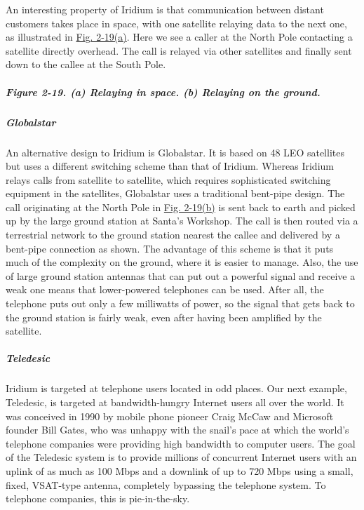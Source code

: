 An interesting property of Iridium is that communication between distant
customers takes place in space, with one satellite relaying data to the
next one, as illustrated in
\protect\hyperlink{0130661023_ch02lev1sec4.htmlux5cux23ch02fig19}{Fig.
2-19(a)}. Here we see a caller at the North Pole contacting a satellite
directly overhead. The call is relayed via other satellites and finally
sent down to the callee at the South Pole.

\subparagraph[Figure 2-19. (a) Relaying in space. (b) Relaying on the
ground.]{\texorpdfstring{\protect\hypertarget{0130661023_ch02lev1sec4.htmlux5cux23ch02fig19}{}{}Figure
2-19. (a) Relaying in space. (b) Relaying on the
ground.}{Figure 2-19. (a) Relaying in space. (b) Relaying on the ground.}}


\protect\hypertarget{0130661023_ch02lev1sec4.htmlux5cux23ch02lev3sec7}{}{}

\subparagraph{Globalstar}

An alternative design to Iridium is Globalstar. It is based on 48 LEO
satellites but uses a different switching scheme than that of Iridium.
Whereas Iridium relays calls from satellite to satellite, which requires
sophisticated switching equipment in the satellites, Globalstar uses a
traditional bent-pipe design. The call originating at the North Pole in
\protect\hyperlink{0130661023_ch02lev1sec4.htmlux5cux23ch02fig19}{Fig.
2-19(b)} is sent back to earth and picked up by the large ground station
at Santa's Workshop. The call is then routed via a terrestrial network
to the ground station nearest the callee and delivered by a bent-pipe
connection as shown. The advantage of this scheme is that it puts much
of the complexity on the ground, where it is easier to manage. Also, the
use of large ground station antennas that can put out a powerful signal
and receive a weak one means that lower-powered telephones can be used.
After all, the telephone puts out only a few milliwatts of power, so the
signal that gets back to the ground station is fairly weak, even after
having been amplified by the satellite.

\protect\hypertarget{0130661023_ch02lev1sec4.htmlux5cux23ch02lev3sec8}{}{}

\subparagraph{Teledesic}

Iridium is targeted at telephone users located in odd places. Our next
example, {Teledesic}, is targeted at bandwidth-hungry Internet users all
over the world. It was conceived in 1990 by mobile phone pioneer Craig
McCaw and Microsoft founder Bill Gates, who was unhappy with the snail's
pace at which the world's telephone companies were providing high
bandwidth to computer users. The goal of the Teledesic system is to
provide millions of concurrent Internet users with an uplink of as much
as 100 Mbps and a downlink of up to 720 Mbps using a small, fixed,
VSAT-type antenna, completely bypassing the telephone system. To
telephone companies, this is pie-in-the-sky.

